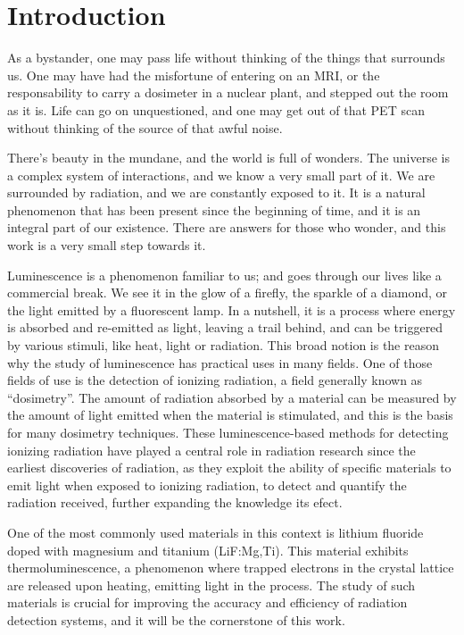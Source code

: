 \chapter{Introduction}



As a bystander, one may pass life without thinking of the things that surrounds us. One may have had the misfortune of entering on an MRI, or the responsability to carry a dosimeter in a nuclear plant, and stepped out the room as it is. Life can go on unquestioned, and one may get out of that PET scan without thinking of the source of that awful noise. 

\vspace{10pt}

There's beauty in the mundane, and the world is full of wonders. The universe is a complex system of interactions, and we know a very small part of it. We are surrounded by radiation, and we are constantly exposed to it. It is a natural phenomenon that has been present since the beginning of time, and it is an integral part of our existence. There are answers for those who wonder, and this work is a very small step towards it.

\vspace{10pt}

Luminescence is a phenomenon familiar to us; and goes through our lives like a commercial break. We see it in the glow of a firefly, the sparkle of a diamond, or the light emitted by a fluorescent lamp. In a nutshell, it is a process where energy is absorbed and re-emitted as light, leaving a trail behind, and can be triggered by various stimuli, like heat, light or radiation. This broad notion is the reason why the study of luminescence has practical uses in many fields. One of those fields of use is the detection of ionizing radiation, a field generally known as ``dosimetry''. The amount of radiation absorbed by a material can be measured by the amount of light emitted when the material is stimulated, and this is the basis for many dosimetry techniques. These luminescence-based methods for detecting ionizing radiation have played a central role in radiation research since the earliest discoveries of radiation, as they exploit the ability of specific materials to emit light when exposed to ionizing radiation, to detect and quantify the radiation received, further expanding the knowledge its efect. 

\vspace{10pt}

One of the most commonly used materials in this context is lithium fluoride doped with magnesium and titanium (LiF:Mg,Ti). This material exhibits thermoluminescence, a phenomenon where trapped electrons in the crystal lattice are released upon heating, emitting light in the process. The study of such materials is crucial for improving the accuracy and efficiency of radiation detection systems, and it will be the cornerstone of this work. 

